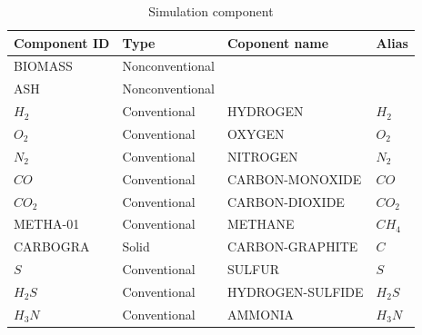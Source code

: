 \begin{table}[h!]
	\centering
	{\small{
	\begin{tabular}{ l|l|l|l } 
		\hline
		Component ID	&	Type			&	Coponent name	&	Alias	\\
		\hline 													
		BIOMASS			&	Nonconventional	&					&			\\		
		ASH				&	Nonconventional	&					&			\\
		$H_2$			&	Conventional	&	HYDROGEN		&	$H_2$	\\
		$O_2$			&	Conventional	&	OXYGEN			&	$O_2$	\\
		$N_2$			&	Conventional	&	NITROGEN		&	$N_2$	\\
		$CO$			&	Conventional	&	CARBON-MONOXIDE	&	$CO$	\\
		$CO_2$			&	Conventional	&	CARBON-DIOXIDE	&	$CO_2$	\\
		METHA-01		&	Conventional	&	METHANE			&	$CH_4$	\\
		CARBOGRA		&	Solid			&	CARBON-GRAPHITE	&	$C$		\\
		$S$				&	Conventional	&	SULFUR			&	$S$ 	\\
		$H_2S$			&	Conventional	&	HYDROGEN-SULFIDE&	$H_2S$	\\
		$H_3N$			&	Conventional	&	AMMONIA			&	$H_3N$ 	\\
		\hline
	\end{tabular}}}
	\caption{Simulation component}
	\label{tbl:Gasification_Components}
\end{table}

